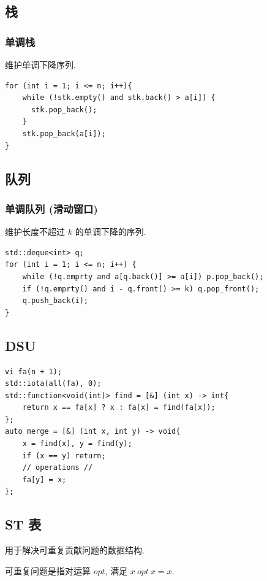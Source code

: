 \documentclass[UTF8, a4paper, titlepage, twoside]{ctexart}
\begin{document}
\subsection{ 栈 }
\subsubsection{ 单调栈 }
维护单调下降序列.

\begin{lstlisting}[style = cpp]
for (int i = 1; i <= n; i++){
    while (!stk.empty() and stk.back() > a[i]) {
      stk.pop_back();
    }
    stk.pop_back(a[i]);
}
\end{lstlisting}

\subsection{ 队列 }
\subsubsection{ 单调队列 (滑动窗口) }
维护长度不超过 $k$ 的单调下降的序列. 

\begin{lstlisting}[style = cpp]
std::deque<int> q;
for (int i = 1; i <= n; i++) {    
    while (!q.emprty and a[q.back()] >= a[i]) p.pop_back();
    if (!q.emprty() and i - q.front() >= k) q.pop_front();
    q.push_back(i);
}
\end{lstlisting}

\subsection{ DSU }
\begin{lstlisting}[style = cpp]
vi fa(n + 1);
std::iota(all(fa), 0);
std::function<void(int)> find = [&] (int x) -> int{
    return x == fa[x] ? x : fa[x] = find(fa[x]);
};
auto merge = [&] (int x, int y) -> void{
    x = find(x), y = find(y);
    if (x == y) return;
    // operations //
    fa[y] = x;
};
\end{lstlisting}

\subsection{ ST 表 }
用于解决可重复贡献问题的数据结构. 

可重复问题是指对运算 $opt$, 满足 $x \ opt \ x = x$. 
\end{document}

